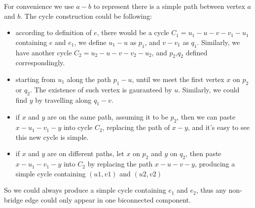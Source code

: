 \documentclass[paper=a4, fontsize=11pt]{scrartcl} %
\numberwithin{equation}{section} %
\numberwithin{figure}{section} %
\numberwithin{table}{section} %
\begin{document}
\begin{enumerate}[label={2.(\alph*)}]
\begin{enumerate}
      For convenience we use $a-b$ to represent there is a simple path between vertex $a$ and $b$. The cycle construction could be following:
      \begin{itemize}
	\item according to definition of $e$, there would be a cycle $C_1=u_1-u-v-v_1-u_1$ containing $e$ and $e_1$, we define $u_1-u$ as $p_1$, and
	  $v-v_1$ as $q_1$. Similarly, we have another cycle $C_2=u_2-u-v-v_2-u_2$, and $p_2$,$q_2$ defined correspondingly.
	\item starting from $u_1$ along the path $p_1-u$, until we meet the first vertex $x$ on $p_2$ or $q_2$. The existence of such vertex is
	  gauranteed by $u$. Similarly, we could find $y$ by travelling along $q_1-v$. 
	\item if $x$ and $y$ are on the same path, assuming it to be $p_2$, then we can paste $x-u_1-v_1-y$ into cycle $C_2$, replacing
	  the path of $x-y$, and it's easy to see this new cycle is simple.
	\item if $x$ and $y$ are on different paths, let $x$ on $p_2$ and $y$ on $q_2$, then paste $x-u_1-v_1-y$ into $C_2$ by
	  replacing the path $x-u-v-y$, producing a simple cycle containing $(u1,v1)$ and $(u2,v2)$
      \end{itemize}
      So we could always produce a simple cycle containing $e_1$ and $e_2$, thus any non-bridge edge could only appear in one
      biconnected component.

  \end{enumerate}



\end{enumerate}
\end{document}
